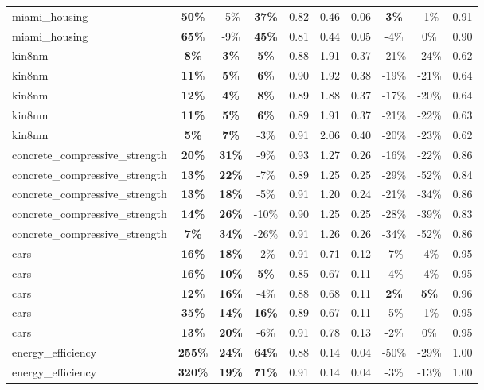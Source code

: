 \begin{table}[!htbp]
\begin{small}
\begin{sc}
{\begin{tabular}{lccccccccc}
miami\_housing & \textbf{50\%} & -5\% & \textbf{37\%} & 0.82 & 0.46 & 0.06 & \textbf{3\%} & -1\% & 0.91 \\
miami\_housing & \textbf{65\%} & -9\% & \textbf{45\%} & 0.81 & 0.44 & 0.05 & -4\% & 0\% & 0.90 \\
kin8nm & \textbf{8\%} & \textbf{3\%} & \textbf{5\%} & 0.88 & 1.91 & 0.37 & -21\% & -24\% & 0.62 \\
kin8nm & \textbf{11\%} & \textbf{5\%} & \textbf{6\%} & 0.90 & 1.92 & 0.38 & -19\% & -21\% & 0.64 \\
kin8nm & \textbf{12\%} & \textbf{4\%} & \textbf{8\%} & 0.89 & 1.88 & 0.37 & -17\% & -20\% & 0.64 \\
kin8nm & \textbf{11\%} & \textbf{5\%} & \textbf{6\%} & 0.89 & 1.91 & 0.37 & -21\% & -22\% & 0.63 \\
kin8nm & \textbf{5\%} & \textbf{7\%} & -3\% & 0.91 & 2.06 & 0.40 & -20\% & -23\% & 0.62 \\
concrete\_compressive\_strength & \textbf{20\%} & \textbf{31\%} & -9\% & 0.93 & 1.27 & 0.26 & -16\% & -22\% & 0.86 \\
concrete\_compressive\_strength & \textbf{13\%} & \textbf{22\%} & -7\% & 0.89 & 1.25 & 0.25 & -29\% & -52\% & 0.84 \\
concrete\_compressive\_strength & \textbf{13\%} & \textbf{18\%} & -5\% & 0.91 & 1.20 & 0.24 & -21\% & -34\% & 0.86 \\
concrete\_compressive\_strength & \textbf{14\%} & \textbf{26\%} & -10\% & 0.90 & 1.25 & 0.25 & -28\% & -39\% & 0.83 \\
concrete\_compressive\_strength & \textbf{7\%} & \textbf{34\%} & -26\% & 0.91 & 1.26 & 0.26 & -34\% & -52\% & 0.86 \\
cars & \textbf{16\%} & \textbf{18\%} & -2\% & 0.91 & 0.71 & 0.12 & -7\% & -4\% & 0.95 \\
cars & \textbf{16\%} & \textbf{10\%} & \textbf{5\%} & 0.85 & 0.67 & 0.11 & -4\% & -4\% & 0.95 \\
cars & \textbf{12\%} & \textbf{16\%} & -4\% & 0.88 & 0.68 & 0.11 & \textbf{2\%} & \textbf{5\%} & 0.96 \\
cars & \textbf{35\%} & \textbf{14\%} & \textbf{16\%} & 0.89 & 0.67 & 0.11 & -5\% & -1\% & 0.95 \\
cars & \textbf{13\%} & \textbf{20\%} & -6\% & 0.91 & 0.78 & 0.13 & -2\% & 0\% & 0.95 \\
energy\_efficiency & \textbf{255\%} & \textbf{24\%} & \textbf{64\%} & 0.88 & 0.14 & 0.04 & -50\% & -29\% & 1.00 \\
energy\_efficiency & \textbf{320\%} & \textbf{19\%} & \textbf{71\%} & 0.91 & 0.14 & 0.04 & -3\% & -13\% & 1.00 \\

\end{tabular}}
\end{sc}
\end{small}
\end{table}
